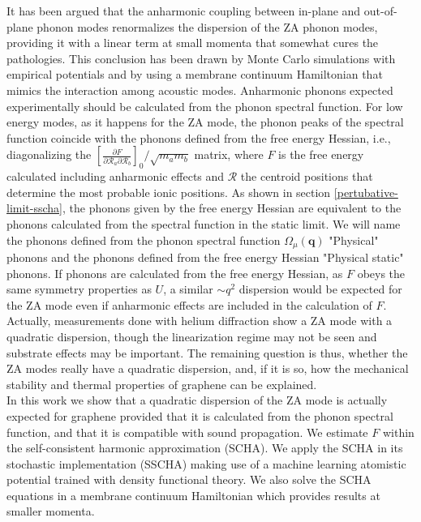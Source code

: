 It has been argued\cite{wang2016anharmonic,los2009scaling,katsnelson2013graphene,zakharchenko2009finite,mariani2008flexural,amorim2014thermodynamics,de2012bending} that the anharmonic coupling between in-plane and out-of-plane phonon 
modes renormalizes the dispersion of the ZA phonon modes, providing it with a linear term at small momenta that 
somewhat cures the pathologies. This conclusion has been drawn by Monte Carlo simulations with empirical 
potentials\cite{wang2016anharmonic,los2009scaling,katsnelson2013graphene,zakharchenko2009finite} and by using a 
membrane continuum  Hamiltonian that mimics the interaction among acoustic 
modes\cite{mariani2008flexural,amorim2014thermodynamics,de2012bending}. Anharmonic phonons expected experimentally 
should be calculated from the phonon spectral function. For low energy modes, as it happens for the ZA mode, the 
phonon peaks of the spectral function coincide with the phonons defined from the
free energy Hessian, i.e., diagonalizing the  $[\frac{\partial F}{\partial \mathcal{R}_a \partial \mathcal{R}_b}]_{0}/\sqrt{m_am_b}$ matrix, where $F$ is the free energy calculated including anharmonic 
effects and $\boldsymbol{\mathcal{R}}$ the centroid positions that determine the most probable ionic 
positions\cite{bianco2017second}. As shown in section \ref{pertubative-limit-sscha}, the phonons given by the free 
energy Hessian are equivalent to the phonons calculated from the spectral function in the static limit. We will name 
the phonons defined from the phonon spectral function $\Omega_{\mu}(\boldsymbol{q})$ "Physical" phonons and the 
phonons defined from the free energy Hessian "Physical static" phonons. 
If phonons are calculated from the free energy Hessian, as $F$ obeys the same symmetry properties as $U$, a similar 
$\sim q^2$ dispersion would be expected for the ZA mode even if anharmonic effects are included in the calculation 
of $F$. Actually, measurements done with helium diffraction show a ZA mode with a quadratic 
dispersion\cite{al2016acoustic,al2015helium,al2018resolving}, though the linearization regime may not be seen and 
substrate effects may be important. The remaining question is thus, whether the ZA modes really have a quadratic 
dispersion, and, if it is so, how the mechanical stability and thermal properties of graphene can be explained. \\

In this work we show that a quadratic dispersion of the ZA mode is actually expected for graphene provided that it 
is calculated from the phonon spectral function, and that it is compatible with sound propagation. We estimate $F$ 
within the self-consistent harmonic approximation (SCHA). We apply the SCHA in its 
stochastic implementation (SSCHA) making use of a machine learning atomistic potential trained with density 
functional theory\cite{rowe2018development}. We also solve the SCHA equations in a membrane continuum Hamiltonian 
which provides results at smaller momenta.

